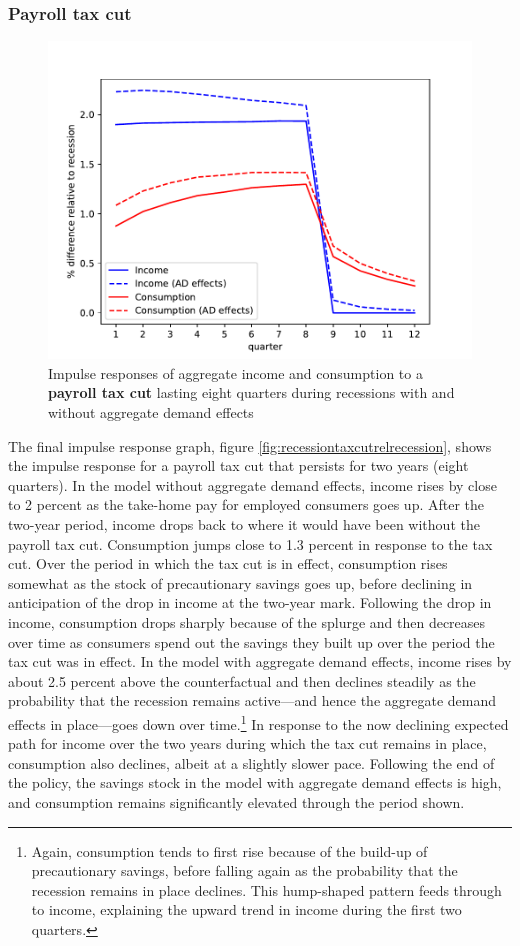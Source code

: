 \documentclass[\econtexRoot/HAFiscal]{subfiles}
\begin{document}
\subsubsection{Payroll tax cut}

\begin{figure}
  \centering
  \includegraphics[width=0.8\linewidth]{Code/HA-Models/FromPandemicCode/Figures/recession_taxcut_relrecession}
  \caption{Impulse responses of aggregate income and consumption to a \textbf{payroll tax cut} lasting eight quarters during recessions with and without aggregate demand effects}
  \notinsubfile{\label{fig:recessiontaxcutrelrecession}}
\end{figure}

The final impulse response graph, figure \ref{fig:recessiontaxcutrelrecession}, shows the impulse response for a payroll tax cut that persists for two years (eight quarters). In the model without aggregate demand effects, income rises by close to 2 percent as the take-home pay for employed consumers goes up. After the two-year period, income drops back to where it would have been without the payroll tax cut. Consumption jumps close to 1.3 percent in response to the tax cut. Over the period in which the tax cut is in effect, consumption rises somewhat as the stock of precautionary savings goes up, before declining in anticipation of the drop in income at the two-year mark. Following the drop in income, consumption drops sharply because of the splurge and then decreases over time as consumers spend out the savings they built up over the period the tax cut was in effect. In the model with aggregate demand effects, income rises by about 2.5 percent above the counterfactual and then declines steadily as the probability that the recession remains active---and hence the aggregate demand effects in place---goes down over time.\footnote{Again, consumption tends to first rise because of the build-up of precautionary savings, before falling again as the probability that the recession remains in place declines. This hump-shaped pattern feeds through to income, explaining the upward trend in income during the first two quarters.} In response to the now declining expected path for income over the two years during which the tax cut remains in place, consumption also declines, albeit at a slightly slower pace. Following the end of the policy, the savings stock in the model with aggregate demand effects is high, and consumption remains significantly elevated through the period shown.
\end{document}
